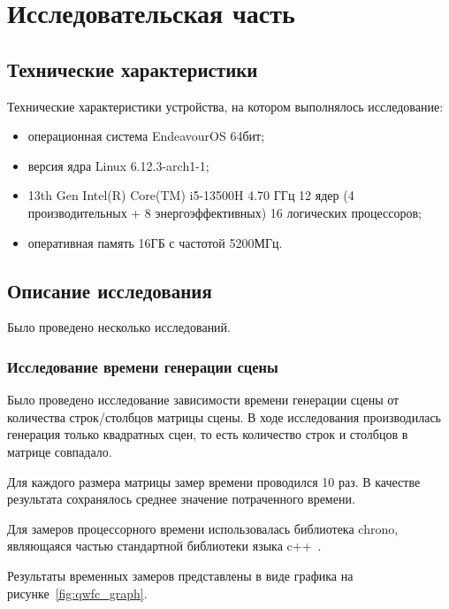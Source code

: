 \chapter{Исследовательская часть}

\section{Технические характеристики}

Технические характеристики устройства, на котором выполнялось исследование:
\begin{itemize}
  \item операционная система EndeavourOS 64бит;
  \item версия ядра Linux 6.12.3-arch1-1;
  \item 13th Gen Intel(R) Core(TM) i5-13500H 4.70 ГГц 12 ядер (4
  производительных + 8 энергоэффективных) 16 логических процессоров;
  \item оперативная память 16ГБ с частотой 5200МГц.
\end{itemize}

\section{Описание исследования}

Было проведено несколько исследований.

\subsection*{Исследование времени генерации сцены}

Было проведено исследование зависимости времени генерации сцены от количества строк/столбцов матрицы сцены. В ходе исследования производилась генерация только квадратных сцен, то есть количество строк и столбцов в матрице совпадало.

Для каждого размера матрицы замер времени проводился 10 раз. В качестве результата сохранялось среднее значение потраченного времени.

Для замеров процессорного времени использовалась библиотека chrono, являющаяся частью стандартной библиотеки языка c++~\cite{cpp}.

Результаты временных замеров представлены в виде графика на рисунке~\ref{fig:qwfc_graph}.

